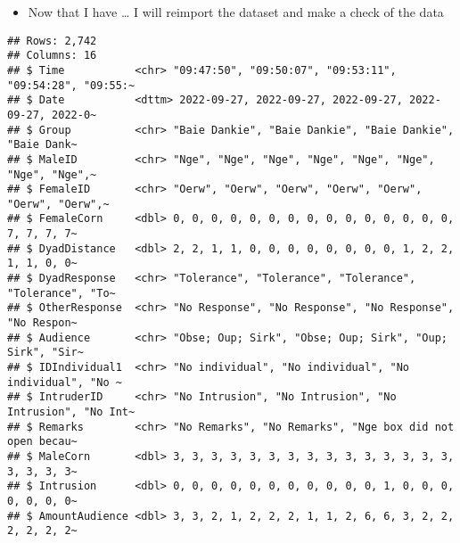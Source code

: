 \documentclass[
]{article}
\providecommand{\tightlist}{%
  \setlength{\itemsep}{0pt}\setlength{\parskip}{0pt}}
\begin{document}
\begin{itemize}
\tightlist
\item
  Now that I have \ldots{} I will reimport the dataset and make a check
  of the data
\end{itemize}

\begin{verbatim}
## Rows: 2,742
## Columns: 16
## $ Time           <chr> "09:47:50", "09:50:07", "09:53:11", "09:54:28", "09:55:~
## $ Date           <dttm> 2022-09-27, 2022-09-27, 2022-09-27, 2022-09-27, 2022-0~
## $ Group          <chr> "Baie Dankie", "Baie Dankie", "Baie Dankie", "Baie Dank~
## $ MaleID         <chr> "Nge", "Nge", "Nge", "Nge", "Nge", "Nge", "Nge", "Nge",~
## $ FemaleID       <chr> "Oerw", "Oerw", "Oerw", "Oerw", "Oerw", "Oerw", "Oerw",~
## $ FemaleCorn     <dbl> 0, 0, 0, 0, 0, 0, 0, 0, 0, 0, 0, 0, 0, 0, 0, 7, 7, 7, 7~
## $ DyadDistance   <dbl> 2, 2, 1, 1, 0, 0, 0, 0, 0, 0, 0, 0, 1, 2, 2, 1, 1, 0, 0~
## $ DyadResponse   <chr> "Tolerance", "Tolerance", "Tolerance", "Tolerance", "To~
## $ OtherResponse  <chr> "No Response", "No Response", "No Response", "No Respon~
## $ Audience       <chr> "Obse; Oup; Sirk", "Obse; Oup; Sirk", "Oup; Sirk", "Sir~
## $ IDIndividual1  <chr> "No individual", "No individual", "No individual", "No ~
## $ IntruderID     <chr> "No Intrusion", "No Intrusion", "No Intrusion", "No Int~
## $ Remarks        <chr> "No Remarks", "No Remarks", "Nge box did not open becau~
## $ MaleCorn       <dbl> 3, 3, 3, 3, 3, 3, 3, 3, 3, 3, 3, 3, 3, 3, 3, 3, 3, 3, 3~
## $ Intrusion      <dbl> 0, 0, 0, 0, 0, 0, 0, 0, 0, 0, 0, 1, 0, 0, 0, 0, 0, 0, 0~
## $ AmountAudience <dbl> 3, 3, 2, 1, 2, 2, 2, 1, 1, 2, 6, 6, 3, 2, 2, 2, 2, 2, 2~
\end{verbatim}
\end{document}
